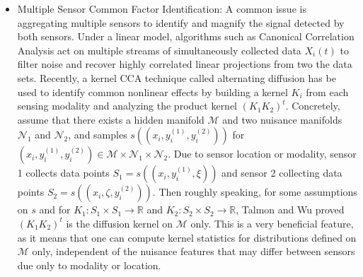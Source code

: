 \documentclass{article}
\begin{document}
\begin{itemize}
\item Multiple Sensor Common Factor Identification: A common issue is aggregating multiple sensors to identify and magnify the signal detected by both sensors.  Under a linear model, algorithms such as Canonical Correlation Analysis \cite{} act on multiple streams of simultaneously collected data $X_i(t)$ to filter noise and recover highly correlated linear projections from two the data sets.
Recently, a kernel CCA technique called alternating diffusion \cite{Talmon Lederman} has be used to identify common nonlinear effects by building a kernel $K_i$ from each sensing modality and analyzing the product kernel $(K_1 K_2)^t$.   Concretely, assume that there exists a hidden manifold $\mathcal{M}$ and two nuisance manifolds $\mathcal{N}_1$ and $\mathcal{N}_2$, and samples $s((x_i,y_i^{(1)}, y_i^{(2)}))$ for $(x_i,y_i^{(1)}, y_i^{(2)})\in \mathcal{M}\times \mathcal{N}_1\times \mathcal{N}_2$.  Due to sensor location or modality, sensor 1 collects data points $S_1 = s((x_i,y_i^{(1)}, \xi))$ and sensor 2 collecting data points $S_2 = s((x_i,\zeta,y_i^{(2)}))$.  Then roughly speaking, for some assumptions on $s$ and for $K_1: S_1\times S_1 \rightarrow \mathbb{R}$ and $K_2:S_2\times S_2 \rightarrow \mathbb{R}$, Talmon and Wu \cite{Talmon Wu} proved $(K_1 K_2)^t$ is the diffusion kernel on $\mathcal{M}$ only.   This is a very beneficial feature, as it means that one can compute kernel statistics for distributions defined on $\mathcal{M}$ only, independent of the nuisance features that may differ between sensors due only to modality or location.



\end{itemize}
\end{document}
